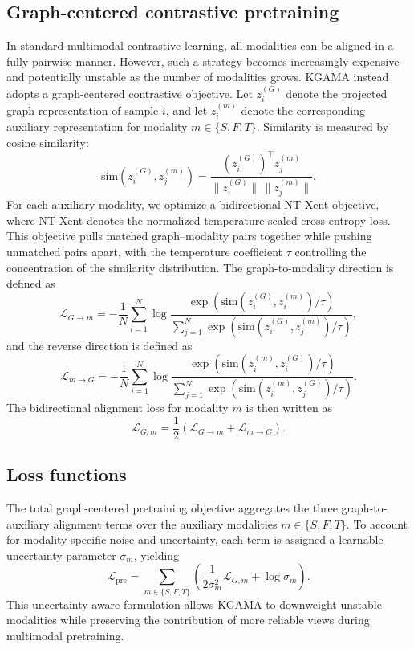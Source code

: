 \documentclass[webpdf,contemporary,large]{oup-authoring-template}%
\begin{document}
\subsection{Graph-centered contrastive pretraining}
In standard multimodal contrastive learning, all modalities can be aligned in a fully pairwise manner. However, such a strategy becomes increasingly expensive and potentially unstable as the number of modalities grows. KGAMA instead adopts a graph-centered contrastive objective. Let $z_i^{(G)}$ denote the projected graph representation of sample $i$, and let $z_i^{(m)}$ denote the corresponding auxiliary representation for modality $m \in \{S,F,T\}$. Similarity is measured by cosine similarity:
\begin{equation}
    \mathrm{sim}(z_i^{(G)}, z_j^{(m)}) = \frac{(z_i^{(G)})^{\top} z_j^{(m)}}{\|z_i^{(G)}\|\,\|z_j^{(m)}\|}.
\end{equation}
For each auxiliary modality, we optimize a bidirectional NT-Xent objective, where NT-Xent denotes the normalized temperature-scaled cross-entropy loss. This objective pulls matched graph--modality pairs together while pushing unmatched pairs apart, with the temperature coefficient $\tau$ controlling the concentration of the similarity distribution. The graph-to-modality direction is defined as
\begin{equation}
    \mathcal{L}_{G \rightarrow m} = -\frac{1}{N} \sum_{i=1}^{N} \log \frac{\exp\left(\mathrm{sim}(z_i^{(G)}, z_i^{(m)})/\tau\right)}{\sum_{j=1}^{N} \exp\left(\mathrm{sim}(z_i^{(G)}, z_j^{(m)})/\tau\right)},
\end{equation}
and the reverse direction is defined as
\begin{equation}
    \mathcal{L}_{m \rightarrow G} = -\frac{1}{N} \sum_{i=1}^{N} \log \frac{\exp\left(\mathrm{sim}(z_i^{(m)}, z_i^{(G)})/\tau\right)}{\sum_{j=1}^{N} \exp\left(\mathrm{sim}(z_i^{(m)}, z_j^{(G)})/\tau\right)}.
\end{equation}
The bidirectional alignment loss for modality $m$ is then written as
\begin{equation}
    \mathcal{L}_{G,m} = \frac{1}{2}\left(\mathcal{L}_{G \rightarrow m} + \mathcal{L}_{m \rightarrow G}\right).
\end{equation}

\subsection{Loss functions}
The total graph-centered pretraining objective aggregates the three graph-to-auxiliary alignment terms over the auxiliary modalities $m \in \{S,F,T\}$. To account for modality-specific noise and uncertainty, each term is assigned a learnable uncertainty parameter $\sigma_m$, yielding
\begin{equation}
    \mathcal{L}_{\mathrm{pre}} = \sum_{m \in \{S,F,T\}} \left( \frac{1}{2\sigma_m^2} \mathcal{L}_{G,m} + \log \sigma_m \right).
\end{equation}
This uncertainty-aware formulation allows KGAMA to downweight unstable modalities while preserving the contribution of more reliable views during multimodal pretraining.
\end{document}
